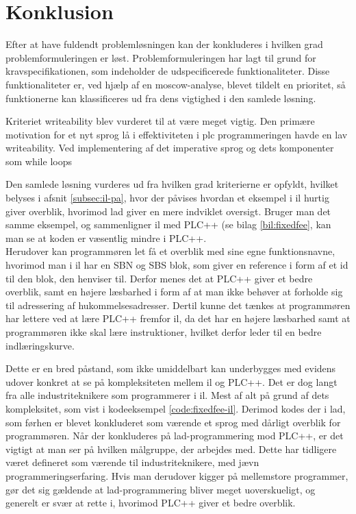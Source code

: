 \chapter{Konklusion}
\label{sec:konklusion}

Efter at have fuldendt problemløsningen kan der konkluderes i hvilken grad problemformuleringen er løst. Problemformuleringen har lagt til grund for kravspecifikationen, som indeholder de udspecificerede funktionaliteter. Disse funktionaliteter er, ved hjælp af en \gls{moscow}-analyse, blevet tildelt en prioritet, så funktionerne kan klassificeres ud fra dens vigtighed i den samlede løsning.



Kriteriet writeability blev vurderet til at være meget vigtig. Den primære motivation for et nyt sprog lå i effektiviteten i plc programmeringen havde en lav writeability. Ved implementering af det imperative sprog og dets komponenter som while loops 




Den samlede løsning vurderes ud fra hvilken grad kriterierne er opfyldt, hvilket belyses i afsnit \ref{subsec:il-pa}, hvor der påvises hvordan et eksempel i \gls{il} hurtig giver overblik, hvorimod \gls{lad} giver en mere indviklet oversigt. Bruger man det samme eksempel, og sammenligner \gls{il} med PLC++ (se bilag \ref{bil:fixedfee}, kan man se at koden er væsentlig mindre i PLC++.\\


\noindent Herudover kan programmøren let få et overblik med sine egne funktionsnavne, hvorimod man i \gls{il} har en SBN og SBS blok, som giver en reference i form af et id til den blok, den henviser til.
Derfor menes det at PLC++ giver et bedre overblik, samt en højere læsbarhed i form af at man ikke behøver at forholde sig til adressering af hukommelsesadresser.
Dertil kunne det tænkes at programmøren har lettere ved at lære PLC++ fremfor \gls{il}, da det har en højere  læsbarhed samt at programmøren ikke skal lære instruktioner, hvilket derfor leder til en bedre indlæringskurve. 

Dette er en bred påstand, som ikke umiddelbart kan underbygges med evidens udover konkret at se på kompleksiteten mellem \gls{il} og PLC++.
Det er dog langt fra alle industriteknikere som programmerer i \gls{il}. Mest af alt på grund af dets kompleksitet, som vist i kodeeksempel \ref{code:fixedfee-il}.
Derimod kodes der i \gls{lad}, som førhen er blevet konkluderet som værende et sprog med dårligt overblik for programmøren.
Når der konkluderes på \gls{lad}-programmering mod PLC++, er det vigtigt at man ser på hvilken målgruppe, der arbejdes med.
Dette har tidligere været defineret som værende til industriteknikere, med jævn programmeringserfaring.
Hvis man derudover kigger på mellemstore programmer, gør det sig gældende at \gls{lad}-programmering bliver meget uoverskueligt, og generelt er svær at rette i, hvorimod PLC++ giver et bedre overblik.\\

